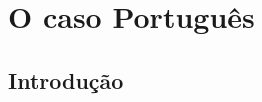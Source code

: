 \chapter{O caso Português}
\label{chap:caso-português}

\section{Introdução}
\label{chap5:sec:intro}


